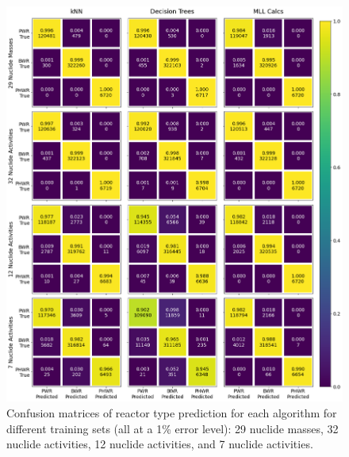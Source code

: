 \begin{figure}[!htbp]
  \centering
  \includegraphics[width=\textwidth]{./chapters/exp2/confusion_matrix_nucs_acts.png}
  \caption{Confusion matrices of reactor type prediction for each algorithm 
           for different training sets (all at a 1\% error level): 29 nuclide 
           masses, 32 nuclide activities, 12 nuclide activities, and 7 nuclide 
           activities.}
  \label{fig:cm_nucs_acts}
\end{figure}

